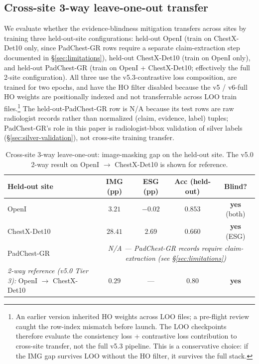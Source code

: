 \documentclass[pmlr]{jmlr}
\begin{document}
\subsection{Cross-site 3-way leave-one-out transfer}
\label{sec:loo}

We evaluate whether the evidence-blindness mitigation transfers across sites by training three held-out-site configurations: held-out OpenI (train on ChestX-Det10 only, since PadChest-GR rows require a separate claim-extraction step documented in §\ref{sec:limitations}), held-out ChestX-Det10 (train on OpenI only), and held-out PadChest-GR (train on OpenI + ChestX-Det10; effectively the full 2-site configuration). All three use the v5.3-contrastive loss composition, are trained for two epochs, and have the HO filter disabled because the v5 / v6-full HO weights are positionally indexed and not transferrable across LOO train files.\footnote{An earlier version inherited HO weights across LOO files; a pre-flight review caught the row-index mismatch before launch. The LOO checkpoints therefore evaluate the consistency loss + contrastive loss contribution to cross-site transfer, not the full v5.3 pipeline. This is a conservative choice: if the IMG gap survives LOO without the HO filter, it survives the full stack.} The held-out-PadChest-GR row is N/A because its test rows are raw radiologist records rather than normalized (claim, evidence, label) tuples; PadChest-GR's role in this paper is radiologist-bbox validation of silver labels (§\ref{sec:silver-validation}), not cross-site training transfer.

\begin{table}[t]
\centering
\small
\caption{Cross-site 3-way leave-one-out: image-masking gap on the held-out site. The v5.0 2-way result on OpenI $\to$ ChestX-Det10 is shown for reference.}
\label{tab:loo}
\begin{tabular}{lcccc}
\toprule
\textbf{Held-out site} & \textbf{IMG (pp)} & \textbf{ESG (pp)} & \textbf{Acc (held-out)} & \textbf{Blind?} \\
\midrule
OpenI         & $3.21$  & $-0.02$ & $0.853$ & \textbf{yes} (both) \\
ChestX-Det10  & $28.41$ & $2.69$  & $0.660$ & \textbf{yes} (ESG) \\
PadChest-GR   & \multicolumn{4}{c}{\emph{N/A — PadChest-GR records require claim-extraction (see §\ref{sec:limitations})}} \\
\midrule
\emph{2-way reference (v5.0 Tier 3):} OpenI $\to$ ChestX-Det10 & $0.29$ & --- & $0.80$ & \textbf{yes} \\
\bottomrule
\end{tabular}
\end{table}
\end{document}
